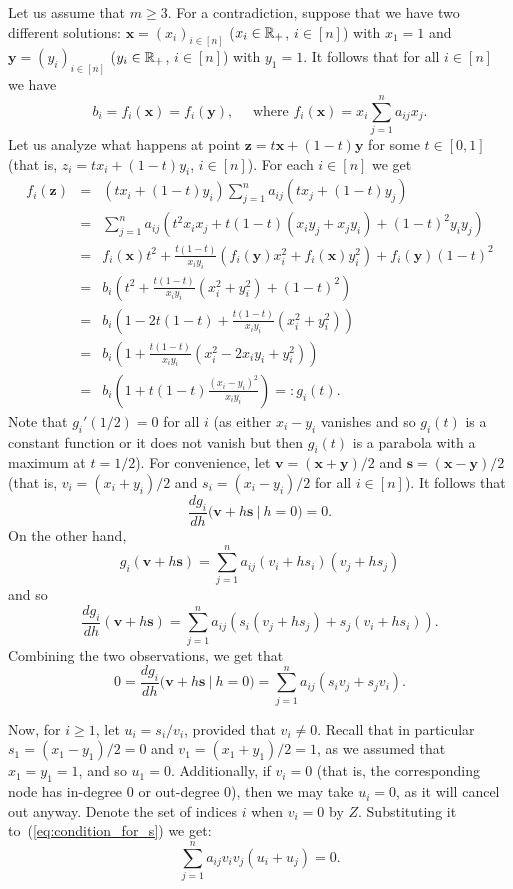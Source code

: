 Let us assume that $m \ge 3$. For a contradiction, suppose that we have two different solutions: $\mathbf{x} = (x_i)_{i\in[n]}$ ($x_i \in {\mathbb R}_+$, $i \in [n]$) with $x_1=1$ and $\mathbf{y} = (y_i)_{i \in [n]}$ ($y_i \in {\mathbb R}_+$, $i \in [n]$) with $y_1=1$. It follows that for all $i \in [n]$ we have
$$
b_i = f_i(\mathbf{x}) = f_i(\mathbf{y}), \quad \text{ where } f_i(\mathbf{x}) = x_i \sum_{j=1}^n a_{ij} x_j.
$$
Let us analyze what happens at point $\mathbf{z} = t\mathbf{x} + (1-t)\mathbf{y}$ for some $t \in [0,1]$ (that is, $z_i = tx_i+(1-t)y_i$, $i \in [n]$). For each $i \in [n]$ we get
\begin{eqnarray*}
f_i(\mathbf{z}) &=& (tx_i+(1-t)y_i) \sum_{j=1}^n a_{ij} (tx_j+(1-t)y_j) \\
&=& \sum_{j=1}^n a_{ij} \left( t^2 x_i x_j+ t(1-t)(x_i y_j + x_j y_i) + (1-t)^2 y_i y_j \right) \\
&=& f_i(\textbf{x}) t^2 + \frac {t(1-t)}{x_i y_i} (f_i(\textbf{y}) x_i^2 + f_i(\textbf{x}) y_i^2) + f_i(\textbf{y}) (1-t)^2 \\
&=& b_i \left( t^2 + \frac {t(1-t)}{x_i y_i} (x_i^2 + y_i^2) + (1-t)^2 \right) \\
&=& b_i \left( 1 - 2t(1-t) + \frac {t(1-t)}{x_i y_i} (x_i^2 + y_i^2) \right) \\
&=& b_i \left( 1 + \frac {t(1-t)}{x_i y_i} (x_i^2 - 2x_iy_i + y_i^2) \right) \\
&=& b_i \left( 1+t(1-t)\frac{(x_i-y_i)^2}{x_iy_i} \right) =: g_i(t).
\end{eqnarray*}
Note that $g_i'(1/2)=0$ for all $i$ (as either $x_i-y_i$ vanishes and so $g_i(t)$ is a constant function or it does not vanish but then $g_i(t)$ is a parabola with a maximum at $t=1/2$). For convenience, let $\mathbf{v} = (\mathbf{x} + \mathbf{y})/2$ and $\mathbf{s} = (\mathbf{x} - \mathbf{y})/2$ (that is, $v_i=(x_i+y_i)/2$ and $s_i=(x_i-y_i)/2$ for all $i \in [n]$). It follows that 
$$
\frac{d g_i}{dh} \Big( \mathbf{v}+h\mathbf{s} ~|~ h=0 \Big)=0.
$$
On the other hand,
$$
g_i(\mathbf{v}+h\mathbf{s}) = \sum_{j=1}^na_{ij}(v_i+hs_i)(v_j+hs_j)
$$
and so
$$
\frac{d g_i}{dh}(\mathbf{v}+h\mathbf{s}) = \sum_{j=1}^na_{ij}(s_i(v_j+hs_j)+s_j(v_i+hs_i)).
$$
Combining the two observations, we get that
\begin{equation}\label{eq:condition_for_s}
0=\frac{d g_i}{dh} \Big( \mathbf{v}+h\mathbf{s} ~|~ h=0 \Big) = \sum_{j=1}^na_{ij}(s_iv_j+s_jv_i).
\end{equation}

Now, for $i \ge 1$, let $u_i = s_i / v_i$, provided that $v_i \neq 0$.
Recall that in particular $s_1=(x_1-y_1)/2=0$ and $v_1=(x_1+y_1)/2=1$, as we assumed that $x_1=y_1=1$, and so $u_1=0$.
Additionally, if $v_i=0$ (that is, the corresponding node has in-degree 0 or out-degree 0), then we may take $u_i=0$, as it will cancel out anyway. Denote the set of indices $i$ when $v_i=0$ by $Z$. Substituting it to~(\ref{eq:condition_for_s}) we get:
$$
\sum_{j=1}^na_{ij}v_iv_j(u_i+u_j) = 0.
$$

